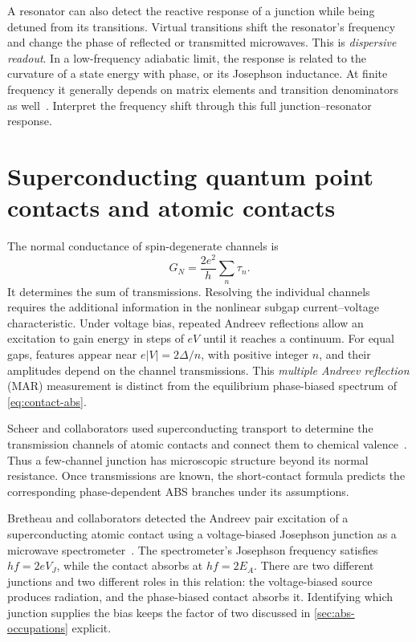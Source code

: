 A resonator can also detect the reactive response of a junction while being
detuned from its transitions. Virtual transitions shift the resonator's
frequency and change the phase of reflected or transmitted microwaves. This is
\emph{dispersive readout}. In a low-frequency adiabatic limit, the response is
related to the curvature of a state energy with phase, or its Josephson
inductance. At finite frequency it generally depends on matrix elements and
transition denominators as well~\cite{metzger2021circuitqed}. Interpret the frequency
shift through this full junction--resonator response.

\section{Superconducting quantum point contacts and atomic contacts}

The normal conductance of spin-degenerate channels is
\begin{equation}
 G_N=\frac{2e^2}{h}\sum_n\tau_n.
\end{equation}
It determines the sum of transmissions. Resolving the individual channels requires
the additional information in the nonlinear subgap current--voltage characteristic. Under voltage
bias, repeated Andreev reflections allow an excitation to gain energy in steps
of $eV$ until it reaches a continuum. For equal gaps, features appear near
$e|V|=2\Delta/n$, with positive integer $n$, and their amplitudes depend on
the channel transmissions. This \emph{multiple Andreev reflection} (MAR)
measurement is distinct from the equilibrium phase-biased spectrum of
\cref{eq:contact-abs}.

Scheer and collaborators used superconducting transport to determine the
transmission channels of atomic contacts and connect them to chemical
valence~\cite{scheer1998signature}. Thus a few-channel junction
has microscopic structure beyond its normal resistance. Once transmissions
are known, the short-contact formula predicts the corresponding phase-dependent
ABS branches under its assumptions.

Bretheau and collaborators detected the Andreev pair excitation of a
superconducting atomic contact using a voltage-biased Josephson junction as a
microwave spectrometer~\cite{bretheau2013exciting}. The spectrometer's Josephson
frequency satisfies $hf=2eV_J$, while the contact absorbs at $hf=2E_A$.
There are two different junctions and two different roles in this relation:
the voltage-biased source produces radiation, and the phase-biased contact
absorbs it. Identifying which junction supplies the bias keeps the factor of two
discussed in \cref{sec:abs-occupations} explicit.

